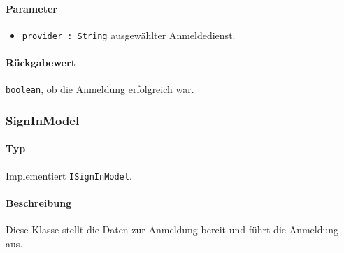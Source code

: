 \paragraph*{Parameter}
\begin{itemize}
    \item \texttt{provider : String} ausgewählter Anmeldedienst.
\end{itemize}
\paragraph*{Rückgabewert}
\texttt{boolean}, ob die Anmeldung erfolgreich war.

\subsubsection{SignInModel}\label{App_Signup_SignInModel}
\paragraph*{Typ}
Implementiert \texttt{ISignInModel}.
\paragraph*{Beschreibung}
Diese Klasse stellt die Daten zur Anmeldung bereit und führt die Anmeldung aus.